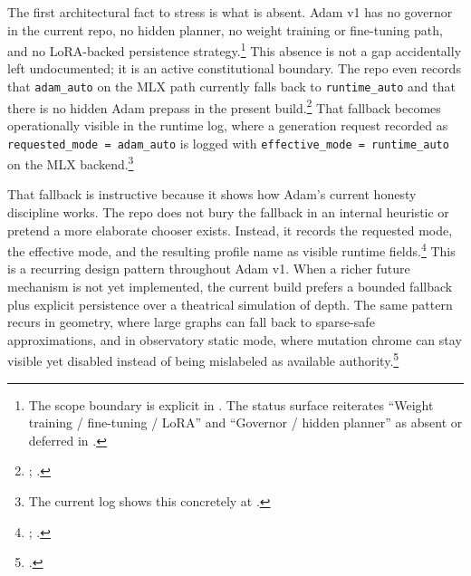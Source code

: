 \documentclass[10pt]{article}
\begin{document}
The first architectural fact to stress is what is absent. Adam v1 has no governor in the current repo, no hidden planner, no weight training or fine-tuning path, and no LoRA-backed persistence strategy.\footnote{The scope boundary is explicit in . The status surface reiterates ``Weight training / fine-tuning / LoRA'' and ``Governor / hidden planner'' as absent or deferred in .} This absence is not a gap accidentally left undocumented; it is an active constitutional boundary. The repo even records that \texttt{adam\_auto} on the MLX path currently falls back to \texttt{runtime\_auto} and that there is no hidden Adam prepass in the present build.\footnote{; .} That fallback becomes operationally visible in the runtime log, where a generation request recorded as \texttt{requested\_mode = adam\_auto} is logged with \texttt{effective\_mode = runtime\_auto} on the MLX backend.\footnote{The current log shows this concretely at .}

That fallback is instructive because it shows how Adam's current honesty discipline works. The repo does not bury the fallback in an internal heuristic or pretend a more elaborate chooser exists. Instead, it records the requested mode, the effective mode, and the resulting profile name as visible runtime fields.\footnote{; .} This is a recurring design pattern throughout Adam v1. When a richer future mechanism is not yet implemented, the current build prefers a bounded fallback plus explicit persistence over a theatrical simulation of depth. The same pattern recurs in geometry, where large graphs can fall back to sparse-safe approximations, and in observatory static mode, where mutation chrome can stay visible yet disabled instead of being mislabeled as available authority.\footnote{.}
\end{document}
